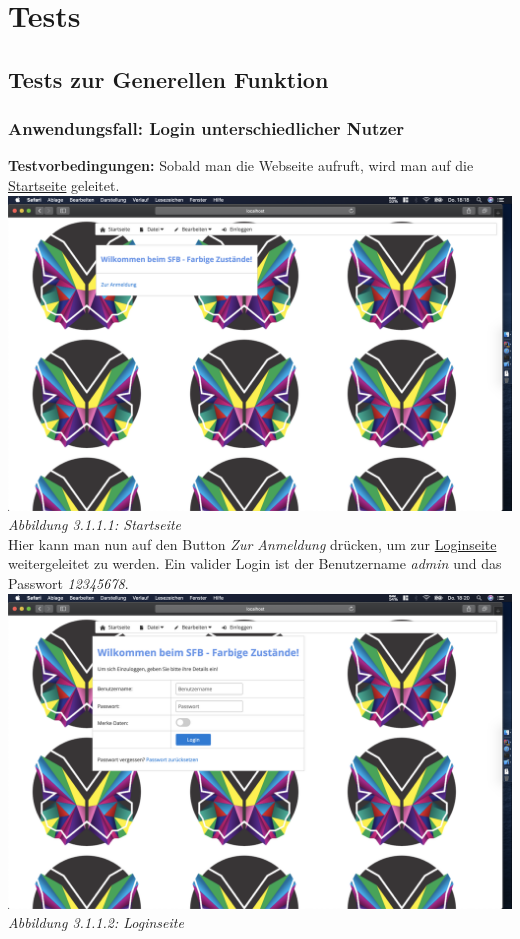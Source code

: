 \documentclass[enabledeprecatedfontcommands,fontsize=12pt,paper=a4,twoside]{scrartcl}
\begin{document}
\newpage
\section{Tests}

\subsection{Tests zur Generellen Funktion}

\subsubsection{Anwendungsfall: Login unterschiedlicher Nutzer}

\textbf{Testvorbedingungen:} Sobald man die Webseite aufruft, wird man auf die \hyperlink{sc3.1.1.1}{Startseite}  geleitet. \\

\hypertarget{sc3.1.1.1}{
\includegraphics[width=1\textwidth]{Screenshots/311StartSite.png}
\textit{Abbildung 3.1.1.1: Startseite}
} \\

Hier kann man nun auf den Button \textit{Zur Anmeldung} drücken, um zur \hyperlink{sc3.1.1.2}{Loginseite} weitergeleitet zu werden. Ein valider Login ist der Benutzername \textit{admin} und das Passwort \textit{12345678}. \\

\hypertarget{sc3.1.1.2}{
\includegraphics[width=1\textwidth]{Screenshots/311LoginSite.png}
\textit{Abbildung 3.1.1.2: Loginseite}
} \\
\end{document}
